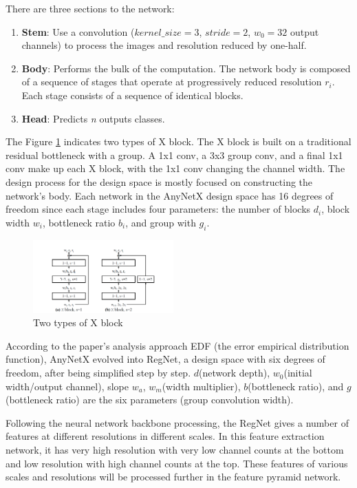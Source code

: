 \documentclass[letterpaper, 10 pt, conference]{ieeeconf}  %
\begin{document}
There are three sections to the network:

\begin{enumerate}
    \item \textbf{Stem}: Use a convolution ($kernel\_size = 3$, $stride = 2$, $w_{0} = 32$ output channels) to process the images and resolution reduced by one-half.
    \item \textbf{Body}: Performs the bulk of the computation. The network body is composed of a sequence of stages that operate at progressively reduced resolution $r_{i}$. Each stage consists of a sequence of identical blocks.
    \item \textbf{Head}: Predicts \textit{n} outputs classes.
\end{enumerate}

The Figure \ref{x_block} indicates two types of X block. The X block is built on a traditional residual bottleneck with a group\cite{Aggregated_Residual_Transformations}. A 1x1 conv, a 3x3 group conv, and a final 1x1 conv make up each X block, with the 1x1 conv changing the channel width. The design process for the design space is mostly focused on constructing the network's body. Each network in the AnyNetX design space has 16 degrees of freedom since each stage includes four parameters: the number of blocks $d_{i}$, block width $w_{i}$, bottleneck ratio $b_{i}$, and group with $g_{i}$.

\begin{figure}[hbt!]
\centering
\includegraphics[width=0.48\textwidth]{gfx/x_block.png}
\caption{Two types of X block}
\label{x_block}
\end{figure}

According to the paper's analysis approach EDF (the error empirical distribution function), AnyNetX evolved into RegNet, a design space with six degrees of freedom, after being simplified step by step. $d$(network depth), $w_{0}$(initial width/output channel), slope $w_{a}$, $w_{m}$(width multiplier), $b$(bottleneck ratio), and $g$(bottleneck ratio) are the six parameters (group convolution width). 

Following the neural network backbone processing, the RegNet gives a number of features at different resolutions in different scales. In this feature extraction network, it has very high resolution with very low channel counts at the bottom and low resolution with high channel counts at the top. These features of various scales and resolutions will be processed further in the feature pyramid network\cite{zhang_2021}.
\end{document}
